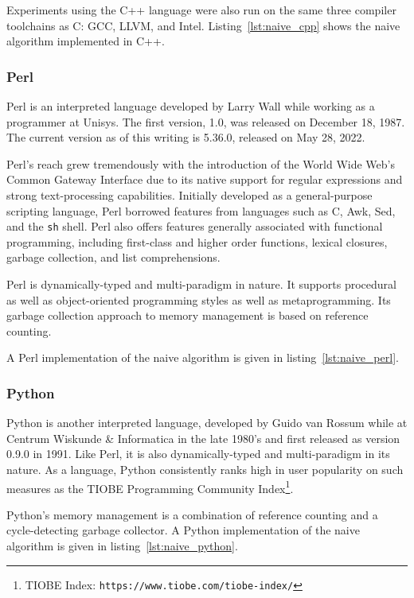 Experiments using the C++ language were also run on the same three compiler toolchains as C: GCC, LLVM, and Intel. Listing~\ref{lst:naive_cpp} shows the naive algorithm implemented in C++.



\subsubsection{Perl}

Perl is an interpreted language developed by Larry Wall while working as a programmer at Unisys. The first version, 1.0, was released on December 18, 1987. The current version as of this writing is 5.36.0, released on May 28, 2022.

Perl's reach grew tremendously with the introduction of the World Wide Web's Common Gateway Interface due to its native support for regular expressions and strong text-processing capabilities. Initially developed as a general-purpose scripting language, Perl borrowed features from languages such as C, Awk, Sed, and the \texttt{sh} shell. Perl also offers features generally associated with functional programming, including first-class and higher order functions, lexical closures, garbage collection, and list comprehensions.

Perl is dynamically-typed and multi-paradigm in nature. It supports procedural as well as object-oriented programming styles as well as metaprogramming. Its garbage collection approach to memory management is based on reference counting.

A Perl implementation of the naive algorithm is given in listing~\ref{lst:naive_perl}.



\subsubsection{Python}

Python is another interpreted language, developed by Guido van Rossum while at Centrum Wiskunde \& Informatica in the late 1980's and first released as version 0.9.0 in 1991. Like Perl, it is also dynamically-typed and multi-paradigm in its nature. As a language, Python consistently ranks high in user popularity on such measures as the TIOBE Programming Community Index\footnote{TIOBE Index: \texttt{https://www.tiobe.com/tiobe-index/}}.

Python's memory management is a combination of reference counting and a cycle-detecting garbage collector. A Python implementation of the naive algorithm is given in listing~\ref{lst:naive_python}.

